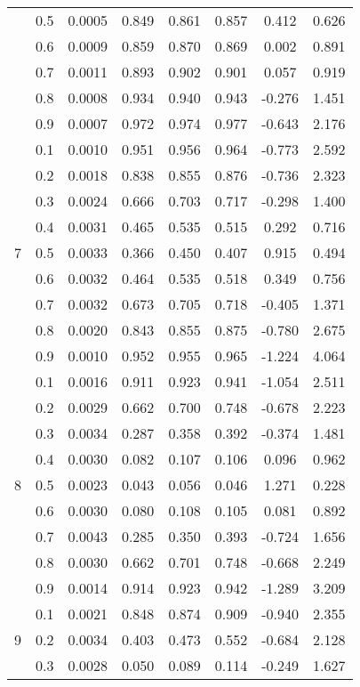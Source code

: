 \documentclass[11pt,a4paper]{report}
\begin{document}
\begin{longtable}{ | c | c || c | c | c | c | c | c | }
 & 0.5 & 0.0005 & 0.849 & 0.861 & 0.857 & 0.412 & 0.626 \\
 & 0.6 & 0.0009 & 0.859 & 0.870 & 0.869 & 0.002 & 0.891 \\
 & 0.7 & 0.0011 & 0.893 & 0.902 & 0.901 & 0.057 & 0.919 \\
 & 0.8 & 0.0008 & 0.934 & 0.940 & 0.943 & -0.276 & 1.451 \\
 & 0.9 & 0.0007 & 0.972 & 0.974 & 0.977 & -0.643 & 2.176 \\
 \hline
\multirow{9}{*}{7} & 0.1 & 0.0010 & 0.951 & 0.956 & 0.964 & -0.773 & 2.592 \\
 & 0.2 & 0.0018 & 0.838 & 0.855 & 0.876 & -0.736 & 2.323 \\
 & 0.3 & 0.0024 & 0.666 & 0.703 & 0.717 & -0.298 & 1.400 \\
 & 0.4 & 0.0031 & 0.465 & 0.535 & 0.515 & 0.292 & 0.716 \\
 & 0.5 & 0.0033 & 0.366 & 0.450 & 0.407 & 0.915 & 0.494 \\
 & 0.6 & 0.0032 & 0.464 & 0.535 & 0.518 & 0.349 & 0.756 \\
 & 0.7 & 0.0032 & 0.673 & 0.705 & 0.718 & -0.405 & 1.371 \\
 & 0.8 & 0.0020 & 0.843 & 0.855 & 0.875 & -0.780 & 2.675 \\
 & 0.9 & 0.0010 & 0.952 & 0.955 & 0.965 & -1.224 & 4.064 \\
 \hline
\multirow{9}{*}{8} & 0.1 & 0.0016 & 0.911 & 0.923 & 0.941 & -1.054 & 2.511 \\
 & 0.2 & 0.0029 & 0.662 & 0.700 & 0.748 & -0.678 & 2.223 \\
 & 0.3 & 0.0034 & 0.287 & 0.358 & 0.392 & -0.374 & 1.481 \\
 & 0.4 & 0.0030 & 0.082 & 0.107 & 0.106 & 0.096 & 0.962 \\
 & 0.5 & 0.0023 & 0.043 & 0.056 & 0.046 & 1.271 & 0.228 \\
 & 0.6 & 0.0030 & 0.080 & 0.108 & 0.105 & 0.081 & 0.892 \\
 & 0.7 & 0.0043 & 0.285 & 0.350 & 0.393 & -0.724 & 1.656 \\
 & 0.8 & 0.0030 & 0.662 & 0.701 & 0.748 & -0.668 & 2.249 \\
 & 0.9 & 0.0014 & 0.914 & 0.923 & 0.942 & -1.289 & 3.209 \\
 \hline
\multirow{9}{*}{9} & 0.1 & 0.0021 & 0.848 & 0.874 & 0.909 & -0.940 & 2.355 \\
 & 0.2 & 0.0034 & 0.403 & 0.473 & 0.552 & -0.684 & 2.128 \\
 & 0.3 & 0.0028 & 0.050 & 0.089 & 0.114 & -0.249 & 1.627 \\

\end{longtable}
\end{document}
